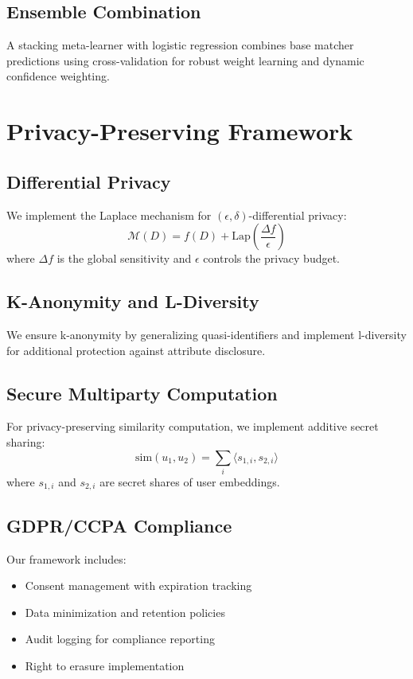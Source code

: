 \documentclass[conference]{IEEEtran}
\begin{document}
\subsection{Ensemble Combination}
A stacking meta-learner with logistic regression combines base matcher predictions using cross-validation for robust weight learning and dynamic confidence weighting.

\section{Privacy-Preserving Framework}

\subsection{Differential Privacy}
We implement the Laplace mechanism for $(\epsilon, \delta)$-differential privacy:
\begin{equation}
\mathcal{M}(D) = f(D) + \text{Lap}\left(\frac{\Delta f}{\epsilon}\right)
\end{equation}
where $\Delta f$ is the global sensitivity and $\epsilon$ controls the privacy budget.

\subsection{K-Anonymity and L-Diversity}
We ensure k-anonymity by generalizing quasi-identifiers and implement l-diversity for additional protection against attribute disclosure.

\subsection{Secure Multiparty Computation}
For privacy-preserving similarity computation, we implement additive secret sharing:
\begin{equation}
\text{sim}(u_1, u_2) = \sum_{i} \langle s_{1,i}, s_{2,i} \rangle
\end{equation}
where $s_{1,i}$ and $s_{2,i}$ are secret shares of user embeddings.

\subsection{GDPR/CCPA Compliance}
Our framework includes:
\begin{itemize}
\item Consent management with expiration tracking
\item Data minimization and retention policies
\item Audit logging for compliance reporting
\item Right to erasure implementation
\end{itemize}
\end{document}
